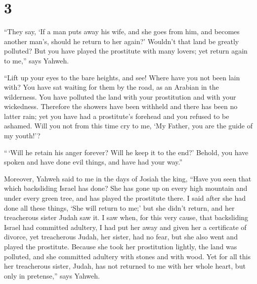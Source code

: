 \hypertarget{section-2}{%
\section{3}\label{section-2}}

 ``They say, `If a man puts away his wife, and she goes from
him, and becomes another man's, should he return to her again?' Wouldn't
that land be greatly polluted? But you have played the prostitute with
many lovers; yet return again to me,'' says Yahweh.

 ``Lift up your eyes to the bare heights, and see! Where
have you not been lain with? You have sat waiting for them by the road,
as an Arabian in the wilderness. You have polluted the land with your
prostitution and with your wickedness.  Therefore the
showers have been withheld and there has been no latter rain; yet you
have had a prostitute's forehead and you refused to be ashamed.
 Will you not from this time cry to me, `My Father, you are
the guide of my youth!'?

 ``\,`Will he retain his anger forever? Will he keep it to
the end?' Behold, you have spoken and have done evil things, and have
had your way.''

 Moreover, Yahweh said to me in the days of Josiah the king,
``Have you seen that which backsliding Israel has done? She has gone up
on every high mountain and under every green tree, and has played the
prostitute there.  I said after she had done all these
things, `She will return to me;' but she didn't return, and her
treacherous sister Judah saw it.  I saw when, for this very
cause, that backsliding Israel had committed adultery, I had put her
away and given her a certificate of divorce, yet treacherous Judah, her
sister, had no fear, but she also went and played the prostitute.
 Because she took her prostitution lightly, the land was
polluted, and she committed adultery with stones and with wood.
 Yet for all this her treacherous sister, Judah, has not
returned to me with her whole heart, but only in pretense,'' says
Yahweh.

